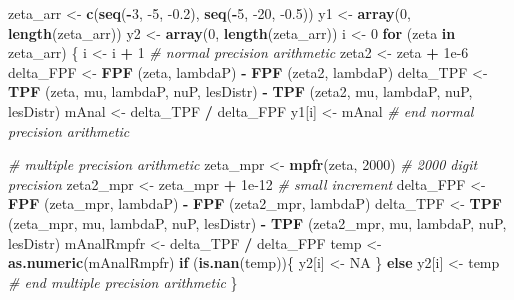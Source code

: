 \documentclass[
]{book}
\newenvironment{Shaded}{\begin{snugshade}}{\end{snugshade}}
\newcommand{\CommentTok}[1]{\textcolor[rgb]{0.56,0.35,0.01}{\textit{#1}}}
\newcommand{\ControlFlowTok}[1]{\textcolor[rgb]{0.13,0.29,0.53}{\textbf{#1}}}
\newcommand{\DecValTok}[1]{\textcolor[rgb]{0.00,0.00,0.81}{#1}}
\newcommand{\FloatTok}[1]{\textcolor[rgb]{0.00,0.00,0.81}{#1}}
\newcommand{\KeywordTok}[1]{\textcolor[rgb]{0.13,0.29,0.53}{\textbf{#1}}}
\newcommand{\NormalTok}[1]{#1}
\newcommand{\OperatorTok}[1]{\textcolor[rgb]{0.81,0.36,0.00}{\textbf{#1}}}
\newcommand{\OtherTok}[1]{\textcolor[rgb]{0.56,0.35,0.01}{#1}}
\newcommand{\StringTok}[1]{\textcolor[rgb]{0.31,0.60,0.02}{#1}}
\begin{document}
\begin{Shaded}
\begin{Highlighting}[]
\NormalTok{zeta_arr <-}\StringTok{ }\KeywordTok{c}\NormalTok{(}\KeywordTok{seq}\NormalTok{(}\OperatorTok{-}\DecValTok{3}\NormalTok{, }\DecValTok{-5}\NormalTok{, }\FloatTok{-0.2}\NormalTok{), }\KeywordTok{seq}\NormalTok{(}\OperatorTok{-}\DecValTok{5}\NormalTok{, }\DecValTok{-20}\NormalTok{, }\FloatTok{-0.5}\NormalTok{))}
\NormalTok{y1 <-}\StringTok{ }\KeywordTok{array}\NormalTok{(}\DecValTok{0}\NormalTok{, }\KeywordTok{length}\NormalTok{(zeta_arr))}
\NormalTok{y2 <-}\StringTok{ }\KeywordTok{array}\NormalTok{(}\DecValTok{0}\NormalTok{, }\KeywordTok{length}\NormalTok{(zeta_arr))}
\NormalTok{i <-}\StringTok{ }\DecValTok{0}
\ControlFlowTok{for}\NormalTok{ (zeta }\ControlFlowTok{in}\NormalTok{ zeta_arr) \{}
\NormalTok{  i <-}\StringTok{ }\NormalTok{i }\OperatorTok{+}\StringTok{ }\DecValTok{1}
  \CommentTok{# normal precision arithmetic}
\NormalTok{  zeta2 <-}\StringTok{ }\NormalTok{zeta }\OperatorTok{+}\StringTok{ }\FloatTok{1e-6}
\NormalTok{  delta_FPF <-}\StringTok{ }\KeywordTok{FPF}\NormalTok{ (zeta, lambdaP) }\OperatorTok{-}\StringTok{ }\KeywordTok{FPF}\NormalTok{ (zeta2, lambdaP)}
\NormalTok{  delta_TPF <-}\StringTok{ }\KeywordTok{TPF}\NormalTok{ (zeta, mu, lambdaP, nuP, lesDistr) }\OperatorTok{-}\StringTok{ }
\StringTok{    }\KeywordTok{TPF}\NormalTok{ (zeta2, mu, lambdaP, nuP, lesDistr)}
\NormalTok{  mAnal <-}\StringTok{ }\NormalTok{delta_TPF }\OperatorTok{/}\StringTok{ }\NormalTok{delta_FPF}
\NormalTok{  y1[i] <-}\StringTok{ }\NormalTok{mAnal}
  \CommentTok{# end normal precision arithmetic}
  
  \CommentTok{# multiple precision arithmetic}
\NormalTok{  zeta_mpr <-}\StringTok{ }\KeywordTok{mpfr}\NormalTok{(zeta, }\DecValTok{2000}\NormalTok{) }\CommentTok{# 2000 digit precision}
\NormalTok{  zeta2_mpr <-}\StringTok{ }\NormalTok{zeta_mpr }\OperatorTok{+}\StringTok{ }\FloatTok{1e-12} \CommentTok{# small increment}
\NormalTok{  delta_FPF <-}\StringTok{ }\KeywordTok{FPF}\NormalTok{ (zeta_mpr, lambdaP) }\OperatorTok{-}\StringTok{ }\KeywordTok{FPF}\NormalTok{ (zeta2_mpr, lambdaP)}
\NormalTok{  delta_TPF <-}\StringTok{ }\KeywordTok{TPF}\NormalTok{ (zeta_mpr, mu, lambdaP, nuP, lesDistr) }\OperatorTok{-}\StringTok{ }
\StringTok{    }\KeywordTok{TPF}\NormalTok{ (zeta2_mpr, mu, lambdaP, nuP, lesDistr)}
\NormalTok{  mAnalRmpfr <-}\StringTok{ }\NormalTok{delta_TPF }\OperatorTok{/}\StringTok{ }\NormalTok{delta_FPF}
\NormalTok{  temp <-}\StringTok{ }\KeywordTok{as.numeric}\NormalTok{(mAnalRmpfr)}
  \ControlFlowTok{if}\NormalTok{ (}\KeywordTok{is.nan}\NormalTok{(temp))\{}
\NormalTok{    y2[i] <-}\StringTok{ }\OtherTok{NA}
\NormalTok{  \} }\ControlFlowTok{else}\NormalTok{ y2[i] <-}\StringTok{ }\NormalTok{temp }
  \CommentTok{# end multiple precision arithmetic}
\NormalTok{\}}
\end{Highlighting}
\end{Shaded}
\end{document}

